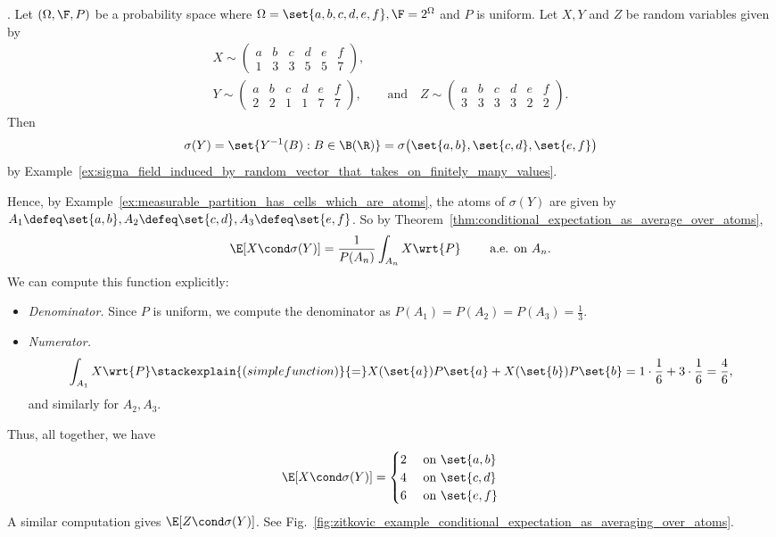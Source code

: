 \documentclass{article} %
\begin{document}
\begin{example}
\cite{zitkovic2013lecture10}. Let $(\Omega, \F, P)$ be a probability space where $\Omega =\set{a,b,c,d,e,f}, \F=2^\Omega$ and $P$ is uniform.  Let $X,Y$ and $Z$ be random variables given by 
\begin{align*}
X \sim 
\begin{pmatrix}
a & b & c & d & e & f \\
1 & 3 & 3 & 5 & 5 & 7	
\end{pmatrix}, &
\\
Y \sim 
\begin{pmatrix}
a & b & c & d & e & f \\
2 & 2 & 1 & 1 & 7 & 7	
\end{pmatrix}, & \quad \text{and} \quad 
Z \sim 
\begin{pmatrix}
a & b & c & d & e & f \\
3 & 3 & 3 & 3 & 2 & 2
\end{pmatrix}. 	
\end{align*}
Then 
\[ \sigma(Y) = \set{Y^{-1}(B) : B \in \B(\R)} = \sigma \big(\set{a,b}, \set{c,d}, \set{e,f} \big) \]
by Example~\ref{ex:sigma_field_induced_by_random_vector_that_takes_on_finitely_many_values}.

Hence, by Example~\ref{ex:measurable_partition_has_cells_which_are_atoms}, the atoms of $\sigma(Y)$ are given by $A_1 \defeq \set{a,b}, A_2 \defeq \set{c,d}, A_3 \defeq \set{e,f}$.
So by Theorem~\ref{thm:conditional_expectation_as_average_over_atoms}, 
\[ \E[X \cond \sigma(Y)] = \frac{1}{P(A_n)} \int_{A_n} X \wrt{P}   \quad \quad \text{ a.e. on } A_n. \]
%
We can compute this function explicitly:
\begin{itemize}
\item \textit{Denominator.}  Since $P$ is uniform, we compute the denominator as $P(A_1)=P(A_2)=P(A_3) = \frac{1}{3}$.
\item \textit{Numerator.}
\[ \int_{A_1} X \wrt{P} \stackexplain{(simple function)}{=} X(\set{a}) P\set{a} + X(\set{b}) P\set{b} = 1 \cdot \frac{1}{6} +  3 \cdot \frac{1}{6} = \frac{4}{6},   \] 
and similarly for $A_2, A_3$.	
\end{itemize}
%
Thus, all together, we have
\[ \E[X \cond \sigma(Y)] = 
\begin{cases}
 2 & \text{ on } \set{a,b} \\
 4 & \text{ on } \set{c,d} \\
 6 & \text{ on } \set{e,f} \\
\end{cases}
\]
A similar computation gives $\E[Z \cond \sigma(Y)]$. See Fig.~\ref{fig:zitkovic_example_conditional_expectation_as_averaging_over_atoms}. 


\end{example}
\end{document}
